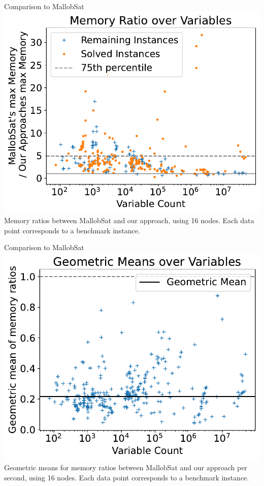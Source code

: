 \documentclass[]{sdqbeamer}
\begin{document}
\begin{frame}{Comparison to MallobSat}
    \center
    \includegraphics[scale=.8]{plots/16node_compare/mem_ratio_over_vars.pdf}\\
    Memory ratios between MallobSat and our approach, using 16 nodes. Each data point corresponds to a benchmark instance.
\end{frame}

\begin{frame}{Comparison to MallobSat}
    \center
    \includegraphics[scale=.8]{plots/16node_compare/mem_gm_over_vars.pdf}\\
    Geometric means for memory ratios between MallobSat and our approach per second, using 16 nodes. Each data point corresponds to a benchmark instance.
\end{frame}
\end{document}
